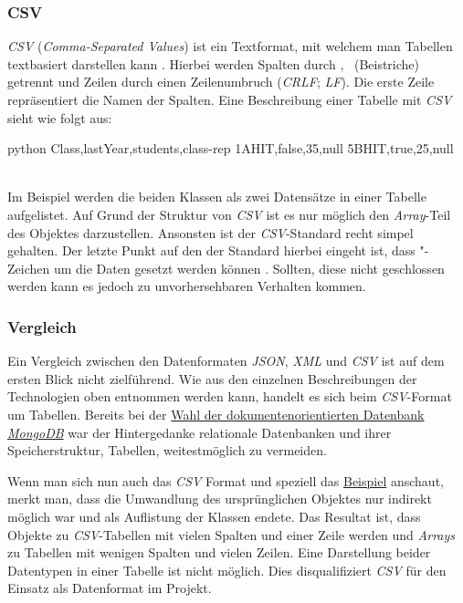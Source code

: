 		\subsubsection{CSV}
		\textit{CSV} (\textit{Comma-Separated Values}) ist ein Textformat, mit welchem man Tabellen textbasiert darstellen kann \cite{rfc4180}. Hierbei werden Spalten durch \dq , \dq  ~(Beistriche) getrennt und Zeilen durch einen Zeilenumbruch (\textit{CRLF}; \textit{LF}). Die erste Zeile repräsentiert die Namen der Spalten. Eine Beschreibung einer Tabelle mit \textit{CSV} sieht wie folgt aus:
		\begin{code}{python}
			Class,lastYear,students,class-rep
			1AHIT,false,35,null
			5BHIT,true,25,null
		\end{code}
		\label{code:csv}~\\
		Im Beispiel werden die beiden Klassen als zwei Datensätze in einer Tabelle aufgelistet. Auf Grund der Struktur von \textit{CSV} ist es nur möglich den \textit{Array}-Teil des Objektes darzustellen. Ansonsten ist der \textit{CSV}-Standard recht simpel gehalten. Der letzte Punkt auf den der Standard hierbei eingeht ist, dass "-Zeichen um die Daten gesetzt werden können \cite{rfc4180}. Sollten, diese nicht geschlossen werden kann es jedoch zu unvorhersehbaren Verhalten kommen.
		\subsubsection{Vergleich}
		Ein Vergleich zwischen den Datenformaten \textit{JSON}, \textit{XML} und \textit{CSV} ist auf dem ersten Blick nicht zielführend. Wie aus den einzelnen Beschreibungen der Technologien oben entnommen werden kann, handelt es sich beim \textit{CSV}-Format um Tabellen. Bereits bei der \hyperref[sec:db]{Wahl der dokumentenorientierten Datenbank \textit{MongoDB}} war der Hintergedanke relationale Datenbanken und ihrer Speicherstruktur, Tabellen, weitestmöglich zu vermeiden. 
		
		Wenn man sich nun auch das \textit{CSV} Format und speziell das \hyperref[code:csv]{Beispiel} anschaut, merkt man, dass die Umwandlung des ursprünglichen Objektes nur indirekt möglich war und als Auflistung der Klassen endete. Das Resultat ist, dass Objekte zu \textit{CSV}-Tabellen mit vielen Spalten und einer Zeile werden und \textit{Arrays} zu Tabellen mit wenigen Spalten und vielen Zeilen. Eine Darstellung beider Datentypen in einer Tabelle ist nicht möglich. Dies disqualifiziert \textit{CSV} für den Einsatz als Datenformat im Projekt.
		
